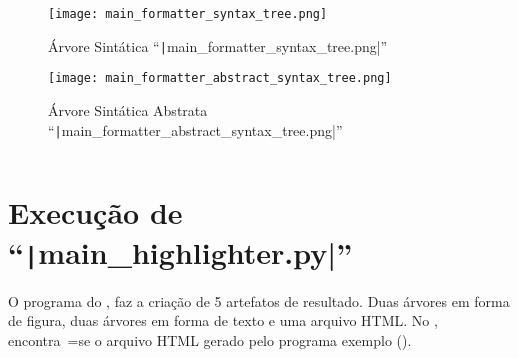 \begin{figure}[!htb]
\caption{Árvore Sintática ``\texttt|main_formatter_syntax_tree.png|''}
\label{figure:MainFormatterSyntaxTree}
\centering
\texttt{[image: main\_formatter\_syntax\_tree.png]}
\end{figure}

\begin{figure}[!htb]
\caption{Árvore Sintática Abstrata ``\texttt|main_formatter_abstract_syntax_tree.png|''}
\label{figure:MainFormatterAbstractSyntaxTree}
\centering
\texttt{[image: main\_formatter\_abstract\_syntax\_tree.png]}
\end{figure}

\begin{code}
\caption{Resultado da execução do arquivo ``\texttt|source/main_formatter.py|''}
\label{code:MainFormatterPyResult}
\inputminted{text}{aftertext/main_formatter_output.txt}
\end{code}


\chapter[main\_highlighter.py]{Execução de ``\texttt|main_highlighter.py|''}

O programa do ,
faz a criação de 5 artefatos de resultado.
Duas árvores em forma de figura,
duas árvores em forma de texto e
uma arquivo HTML.
No ,
encontra~=se o arquivo HTML gerado pelo programa exemplo ().

